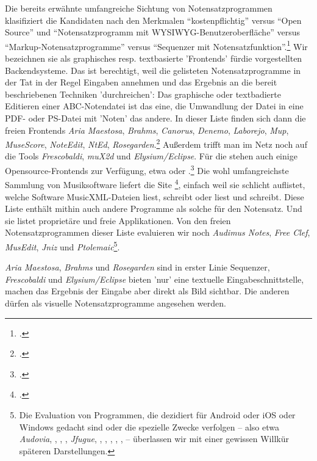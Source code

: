 Die bereits erwähnte umfangreiche Sichtung von Notensatzprogrammen klasifiziert
die Kandidaten nach den Merkmalen \enquote{kostenpflichtig} versus \enquote{Open
Source} und \enquote{Notensatzprogramm mit WYSIWYG-Benutzeroberfläche} versus
\enquote{Markup-Notensatzprogramme} versus \enquote{Sequenzer mit
Notensatzfunktion}.\footcite[vgl.][\nopage wp]{WpedNotensatz2019a} Wir
bezeichnen sie als graphisches resp. textbasierte 'Frontends' fürdie
vorgestellten Backendsysteme. Das ist berechtigt, weil die gelisteten
Notensatzprogramme in der Tat in der Regel Eingaben annehmen und das Ergebnis an
die bereit beschriebenen Techniken 'durchreichen': Das graphische oder
textbadierte Editieren einer ABC-Notendatei ist das eine, die Umwandlung der
Datei in eine PDF- oder PS-Datei mit 'Noten' das andere. In dieser Liste finden
sich dann die freien Frontends \textit{Aria Maestosa}, \textit{Brahms},
\textit{Canorus}, \textit{Denemo}, \textit{Laborejo}, \textit{Mup},
\textit{MuseScore}, \textit{NoteEdit}, \textit{NtEd},
\textit{Rosegarden}.\footcite[vgl.][\nopage wp]{WpedNotensatz2019a} Außerdem
trifft man im Netz noch auf die Tools \textit{Frescobaldi}, \textit{muX2d} und
\textit{Elysium/Eclipse}. Für die  stehen auch einige
Opensource-Frontends zur Verfügung, etwa  oder
.\footcite[vgl.][\nopage wp]{Abc2018b} Die wohl umfangreichste
Sammlung von Musiksoftware liefert die Site
\footcite[vgl.][\nopage wp]{MusicXML2018b}, einfach weil sie
schlicht auflistet, welche Software MusicXML-Dateien liest, schreibt oder liest
und schreibt. Diese Liste enthält mithin auch andere Programme als solche für
den Notensatz. Und sie listet proprietäre und freie Applikationen. Von den
freien Notensatzprogrammen dieser Liste evaluieren wir noch \textit{Audimus
Notes}, \textit{Free Clef}, \textit{MusEdit}, \textit{Jniz} und
\textit{Ptolemaic}\footnote{Die Evaluation von Programmen, die dezidiert für
Android oder iOS oder Windows gedacht sind oder die spezielle Zwecke verfolgen
-- also etwa \textit{Audovia}, , , ,
\textit{Jfugue}, , , ,
, ,  -- überlassen wir
mit einer gewissen Willkür späteren Darstellungen.}.


\textit{Aria Maestosa}, \textit{Brahms} und \textit{Rosegarden}
sind in erster Linie \textsf{Sequenzer}, \textit{Frescobaldi} und
\textit{Elysium/Eclipse} bieten 'nur' eine textuelle Eingabeschnittstelle,
machen das Ergebnis der Eingabe aber direkt als Bild sichtbar. Die anderen
dürfen als visuelle Notensatzprogramme angesehen werden.

